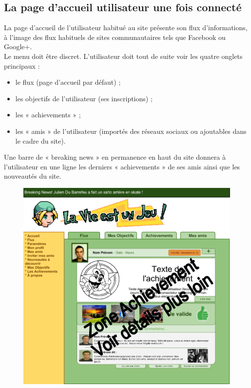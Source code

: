 \documentclass{life-fr}
\begin{document}
\newpage

\subsection{La page d'accueil utilisateur une fois connecté}

La page d'accueil de l'utilisateur habitué au site présente son flux d'informations, à l'image des flux habituels de sites communautaires tels que Facebook ou Google+. \\

Le menu doit être discret. L'utilisateur doit tout de suite voir les quatre onglets principaux :

\begin{itemize}
  \item le flux (page d'accueil par défaut) ;
  \item les objectifs de l'utilisateur (ses inscriptions) ;
  \item les « achievements » ;
  \item les « amis » de l'utilisateur (importés des réseaux sociaux ou ajoutables dans le cadre du site).
\end{itemize}

Une barre de « breaking news » en permanence en haut du site donnera à l'utilisateur en une ligne les derniers « achievements » de ses amis ainsi que les nouveautés du site.

\begin{figure}[H]
  \begin{center}
    \includegraphics[width=15cm]{img/accueil.png}
  \end{center}
\end{figure}
\end{document}
